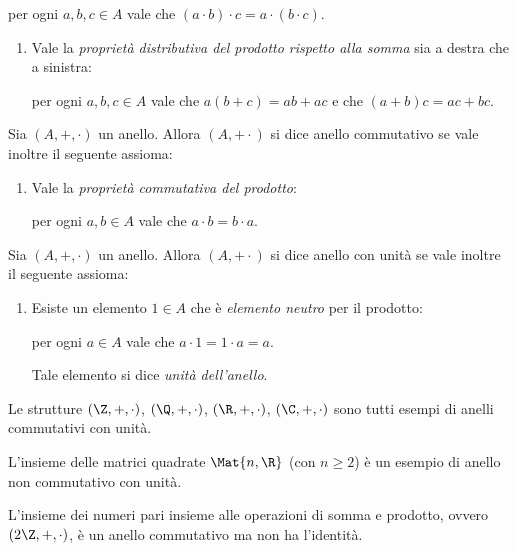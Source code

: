 \begin{definition}
\begin{enumerate}[label={(P)}]
\begin{enumerate}[label={(P\arabic*)}]
            per ogni $a, b, c \in A$ vale che $(a \cdot b) \cdot c = a \cdot (b \cdot c)$.
        \end{enumerate}
    \end{enumerate}
    \begin{enumerate}[label=(D)]
        \item \label{def:anello:distr} Vale la \emph{proprietà distributiva del prodotto rispetto alla somma} sia a destra che a sinistra:
         
        per ogni $a, b, c \in A$ vale che $a(b + c) = ab + ac$ e che $(a + b)c = ac + bc$.
    \end{enumerate}
\end{definition}

\begin{definition}
    \label{def:anello_comm}
    Sia $(A, +, \cdot)$ un anello. Allora $(A, + \cdot)$ si dice anello commutativo se vale inoltre il seguente assioma:
    \begin{enumerate}[label={(P\arabic*)}, start=2]
        \item \label{def:anello_prod:com} Vale la \emph{proprietà commutativa del prodotto}:
        
        per ogni $a, b \in A$ vale che $a \cdot b = b \cdot a$.
    \end{enumerate}
\end{definition}

\begin{definition}
    \label{def:anello_con_unit}
    Sia $(A, +, \cdot)$ un anello. Allora $(A, + \cdot)$ si dice anello con unità se vale inoltre il seguente assioma:
    \begin{enumerate}[label={(P\arabic*)}, start=2]
        \item \label{def:anello_prod:unit} Esiste un elemento $1 \in A$ che è \emph{elemento neutro} per il prodotto:
        
        per ogni $a \in A$ vale che $a \cdot 1 = 1 \cdot a = a$.

        Tale elemento si dice \emph{unità dell'anello}.
    \end{enumerate}
\end{definition}

\begin{example}
    Le strutture $(\Z, +, \cdot)$, $(\Q, +, \cdot)$, $(\R, +, \cdot)$, $(\C, +, \cdot)$ sono tutti esempi di anelli commutativi con unità.
\end{example}
\begin{example}
    L'insieme delle matrici quadrate $\Mat{n, \R}$ (con $n \geq 2$) è un esempio di anello non commutativo con unità.
\end{example}
\begin{example}
    L'insieme dei numeri pari insieme alle operazioni di somma e prodotto, ovvero $(2\Z, +, \cdot)$, è un anello commutativo ma non ha l'identità.
\end{example}

